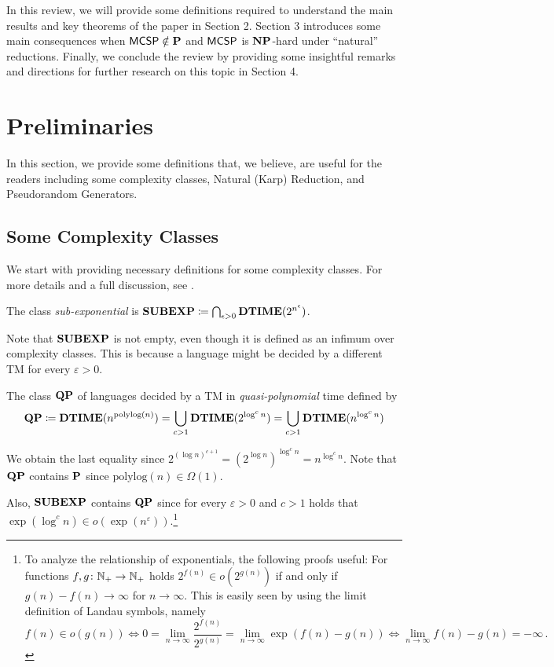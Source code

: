 \documentclass[11pt]{article}
\begin{document}
In this review, we will provide some definitions required to understand the main results and key theorems of the paper in Section 2. Section 3 introduces some main consequences when $\mathprob{MCSP} \notin \P$ and $\mathprob{MCSP}$ is $\NP$-hard under ``natural'' reductions. Finally, we conclude the review by providing some insightful remarks and directions for further research on this topic in Section 4.

\section{Preliminaries}

In this section, we provide some definitions that, we believe, are useful for the readers including some complexity classes, Natural (Karp) Reduction, and Pseudorandom Generators.

\subsection{Some Complexity Classes}
We start with providing necessary definitions for some complexity classes.
For more details and a full discussion, see \cite{arora2009}.

\begin{definition}
  The class \emph{sub-exponential} is
  $\class{SUBEXP} \coloneqq \bigcap_{\epsilon > 0} \TIME(2^{n^{\epsilon}})$.
\end{definition}

Note that $\class{SUBEXP}$ is not empty, even though it is defined as an infimum
over complexity classes. This is because a language might be decided by a
different TM for every $\varepsilon > 0$.

\begin{definition}
	The class $\class{QP}$ of languages decided by a TM in
	\emph{quasi-polynomial} time defined by
	\[
	\class{QP}
	\coloneqq
	\TIME(n^{\mathrm{polylog}(n)})
	=
	\bigcup_{c > 1}\TIME(2^{\log^c n})
	=
	\bigcup_{c > 1}\TIME(n^{\log^c n})
	\]
\end{definition}
We obtain the last equality since
$2^{(\log n)^{c+1}} = (2^{\log n})^{\log^c n} = n^{\log^c n}$.
%
Note that $\class{QP}$ contains $\P$ since
$\mathrm{polylog}(n) \in \Omega(1)$.

Also, $\class{SUBEXP}$ contains $\class{QP}$ since for every
$\varepsilon > 0$ and $c > 1$ holds that
$\exp(\log^c n) \in o(\exp(n^\varepsilon))$.\footnote{To analyze the
relationship of exponentials, the following proofs useful:
For functions $f, g \colon \N_+ \to \N_+$ holds
$2^{f(n)} \in o(2^{g(n)})$ if and only if $g(n) - f(n) \to \infty$ for
$n \to \infty$.
This is easily seen by using the limit definition of Landau symbols, namely
\[
  f(n) \in o(g(n))
  \iff
  0 = \lim_{n \to \infty} \frac{2^{f(n)}}{2^{g(n)}}
  = \lim_{n \to \infty} \exp(f(n) - g(n))
  \iff
  \lim_{n \to \infty} f(n) - g(n) = -\infty \,.
\]}
\end{document}
